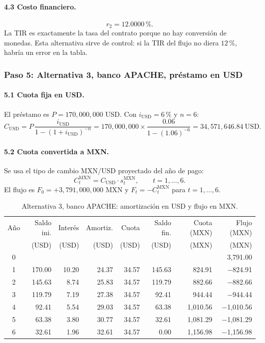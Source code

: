 \documentclass[11pt]{article}
\newcommand{\pc}{\text{\%}}
\begin{document}
\paragraph{4.3 Costo financiero.}
\[
r_2=12.0000\,\pc.
\]
La TIR es exactamente la tasa del contrato porque no hay conversi\'on de monedas. Esta alternativa sirve de control: si la TIR del flujo no diera $12\,\pc$, habr\'ia un error en la tabla.

\subsubsection*{Paso 5: Alternativa 3, banco APACHE, pr\'estamo en USD}

\paragraph{5.1 Cuota fija en USD.} El pr\'estamo es $P=170{,}000{,}000$ USD. Con $i_{\text{USD}}=6\,\pc$ y $n=6$:
\[
C_{\text{USD}}=P\,\frac{i_{\text{USD}}}{1-(1+i_{\text{USD}})^{-n}}=170{,}000{,}000\times\frac{0.06}{1-(1.06)^{-6}}=34{,}571{,}646.84\ \text{USD.}
\]

\paragraph{5.2 Cuota convertida a MXN.} Se usa el tipo de cambio MXN/USD proyectado del a\~no de pago:
\[
C^{\text{MXN}}_t=C_{\text{USD}}\cdot s^{\text{MXN}}_t,\qquad t=1,\dots,6 .
\]
El flujo es $F_0=+3{,}791{,}000{,}000$ MXN y $F_t=-C^{\text{MXN}}_t$ para $t=1,\dots,6$.

\begin{table}[H]\centering\small
\caption{Alternativa 3, banco APACHE: amortizaci\'on en USD y flujo en MXN.}\label{tab:a3}
\begin{tabular}{c r r r r r r r}\toprule
Año & Saldo ini. & Interés & Amortiz. & Cuota & Saldo fin. & Cuota (MXN) & Flujo (MXN)\\
& (USD) & (USD) & (USD) & (USD) & (USD) & (MXN) & (MXN)\\\midrule
0 & & & & & & & 3{,}791.00\\
1 & 170.00 & 10.20 & 24.37 & 34.57 & 145.63 & 824.91 & $-$824.91\\
2 & 145.63 & 8.74 & 25.83 & 34.57 & 119.79 & 882.66 & $-$882.66\\
3 & 119.79 & 7.19 & 27.38 & 34.57 & 92.41 & 944.44 & $-$944.44\\
4 & 92.41 & 5.54 & 29.03 & 34.57 & 63.38 & 1{,}010.56 & $-$1{,}010.56\\
5 & 63.38 & 3.80 & 30.77 & 34.57 & 32.61 & 1{,}081.29 & $-$1{,}081.29\\
6 & 32.61 & 1.96 & 32.61 & 34.57 & 0.00 & 1{,}156.98 & $-$1{,}156.98\\
\bottomrule\end{tabular}
\par{}\end{table}
\end{document}
